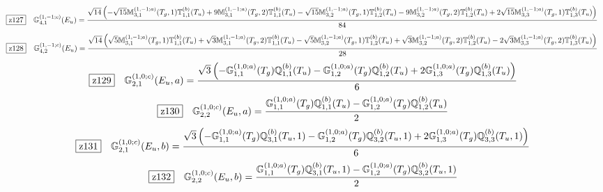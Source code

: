 \documentclass[fleqn,10pt,landscape]{jsarticle}
\begin{document}
\begin{dmath*}
\hspace*{3mm}\fbox{z127}\quad \mathbb{G}_{4,1}^{(1,-1;c)}(E_{u})=\frac{\sqrt{14} \left(- \sqrt{15} \mathbb{M}_{3,1}^{(1,-1;a)}(T_{g},1) \mathbb{T}_{1,1}^{(b)}(T_{u}) + 9 \mathbb{M}_{3,1}^{(1,-1;a)}(T_{g},2) \mathbb{T}_{1,1}^{(b)}(T_{u}) - \sqrt{15} \mathbb{M}_{3,2}^{(1,-1;a)}(T_{g},1) \mathbb{T}_{1,2}^{(b)}(T_{u}) - 9 \mathbb{M}_{3,2}^{(1,-1;a)}(T_{g},2) \mathbb{T}_{1,2}^{(b)}(T_{u}) + 2 \sqrt{15} \mathbb{M}_{3,3}^{(1,-1;a)}(T_{g},1) \mathbb{T}_{1,3}^{(b)}(T_{u})\right)}{84}
\end{dmath*}
\begin{dmath*}
\hspace*{3mm}\fbox{z128}\quad \mathbb{G}_{4,2}^{(1,-1;c)}(E_{u})=\frac{\sqrt{14} \left(\sqrt{5} \mathbb{M}_{3,1}^{(1,-1;a)}(T_{g},1) \mathbb{T}_{1,1}^{(b)}(T_{u}) + \sqrt{3} \mathbb{M}_{3,1}^{(1,-1;a)}(T_{g},2) \mathbb{T}_{1,1}^{(b)}(T_{u}) - \sqrt{5} \mathbb{M}_{3,2}^{(1,-1;a)}(T_{g},1) \mathbb{T}_{1,2}^{(b)}(T_{u}) + \sqrt{3} \mathbb{M}_{3,2}^{(1,-1;a)}(T_{g},2) \mathbb{T}_{1,2}^{(b)}(T_{u}) - 2 \sqrt{3} \mathbb{M}_{3,3}^{(1,-1;a)}(T_{g},2) \mathbb{T}_{1,3}^{(b)}(T_{u})\right)}{28}
\end{dmath*}
\begin{dmath*}
\hspace*{3mm}\fbox{z129}\quad \mathbb{G}_{2,1}^{(1,0;c)}(E_{u},a)=\frac{\sqrt{3} \left(- \mathbb{G}_{1,1}^{(1,0;a)}(T_{g}) \mathbb{Q}_{1,1}^{(b)}(T_{u}) - \mathbb{G}_{1,2}^{(1,0;a)}(T_{g}) \mathbb{Q}_{1,2}^{(b)}(T_{u}) + 2 \mathbb{G}_{1,3}^{(1,0;a)}(T_{g}) \mathbb{Q}_{1,3}^{(b)}(T_{u})\right)}{6}
\end{dmath*}
\begin{dmath*}
\hspace*{3mm}\fbox{z130}\quad \mathbb{G}_{2,2}^{(1,0;c)}(E_{u},a)=\frac{\mathbb{G}_{1,1}^{(1,0;a)}(T_{g}) \mathbb{Q}_{1,1}^{(b)}(T_{u}) - \mathbb{G}_{1,2}^{(1,0;a)}(T_{g}) \mathbb{Q}_{1,2}^{(b)}(T_{u})}{2}
\end{dmath*}
\begin{dmath*}
\hspace*{3mm}\fbox{z131}\quad \mathbb{G}_{2,1}^{(1,0;c)}(E_{u},b)=\frac{\sqrt{3} \left(- \mathbb{G}_{1,1}^{(1,0;a)}(T_{g}) \mathbb{Q}_{3,1}^{(b)}(T_{u},1) - \mathbb{G}_{1,2}^{(1,0;a)}(T_{g}) \mathbb{Q}_{3,2}^{(b)}(T_{u},1) + 2 \mathbb{G}_{1,3}^{(1,0;a)}(T_{g}) \mathbb{Q}_{3,3}^{(b)}(T_{u},1)\right)}{6}
\end{dmath*}
\begin{dmath*}
\hspace*{3mm}\fbox{z132}\quad \mathbb{G}_{2,2}^{(1,0;c)}(E_{u},b)=\frac{\mathbb{G}_{1,1}^{(1,0;a)}(T_{g}) \mathbb{Q}_{3,1}^{(b)}(T_{u},1) - \mathbb{G}_{1,2}^{(1,0;a)}(T_{g}) \mathbb{Q}_{3,2}^{(b)}(T_{u},1)}{2}
\end{dmath*}
\end{document}
